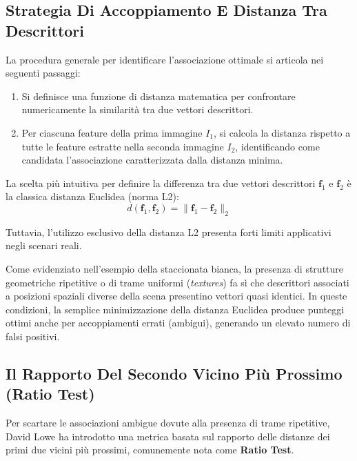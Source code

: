 ﻿\documentclass[11pt, a4paper]{article}
\begin{document}
\subsection{Strategia Di Accoppiamento E Distanza Tra Descrittori}

La procedura generale per identificare l'associazione ottimale si articola nei seguenti passaggi:
\begin{enumerate}
    \item Si definisce una funzione di distanza matematica per confrontare numericamente la similarità tra due vettori descrittori.
    \item Per ciascuna feature della prima immagine $I_1$, si calcola la distanza rispetto a tutte le feature estratte nella seconda immagine $I_2$, identificando come candidata l'associazione caratterizzata dalla distanza minima.
\end{enumerate}

La scelta più intuitiva per definire la differenza tra due vettori descrittori $\bm{f}_1$ e $\bm{f}_2$ è la classica distanza Euclidea (norma L2):
\[ d(\bm{f}_1, \bm{f}_2) = \lVert \bm{f}_1 - \bm{f}_2 \rVert_2 \]

Tuttavia, l'utilizzo esclusivo della distanza L2 presenta forti limiti applicativi negli scenari reali.


Come evidenziato nell'esempio della staccionata bianca, la presenza di strutture geometriche ripetitive o di trame uniformi (\emph{textures}) fa sì che descrittori associati a posizioni spaziali diverse della scena presentino vettori quasi identici. In queste condizioni, la semplice minimizzazione della distanza Euclidea produce punteggi ottimi anche per accoppiamenti errati (ambigui), generando un elevato numero di falsi positivi.

\subsection{Il Rapporto Del Secondo Vicino Più Prossimo (Ratio Test)}

Per scartare le associazioni ambigue dovute alla presenza di trame ripetitive, David Lowe ha introdotto una metrica basata sul rapporto delle distanze dei primi due vicini più prossimi, comunemente nota come \textbf{Ratio Test}.
\end{document}
